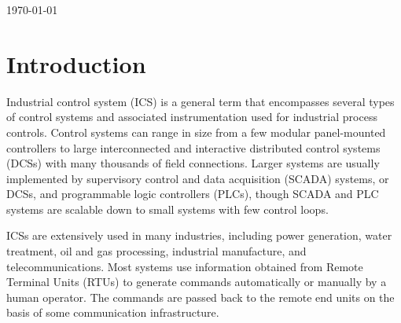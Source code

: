 \documentclass[english,12pt]{article}
\begin{document}
\begin{titlepage}


{\large \today}\\[3cm] 


\vfill %

\end{titlepage}

\pagebreak{}


\tableofcontents{}

\pagebreak{}


\section{Introduction} \label{introduction}

Industrial control system (ICS) is a general term that encompasses several types
of control systems and associated instrumentation used for industrial process
controls. Control systems can range in size from a few modular panel-mounted
controllers to large interconnected and interactive distributed control systems
(DCSs) with many thousands of field connections. Larger systems are usually
implemented by supervisory control and data acquisition (SCADA) systems, or DCSs,
and programmable logic controllers (PLCs), though SCADA and PLC systems are
scalable down to small systems with few control loops.

ICSs are extensively used in many industries, including power generation, water
treatment, oil and gas processing, industrial manufacture, and telecommunications.
Most systems use information obtained from Remote Terminal Units (RTUs) to generate
commands automatically or manually by a human operator. The commands are passed
back to the remote end units on the basis of some communication infrastructure.

\end{document}

